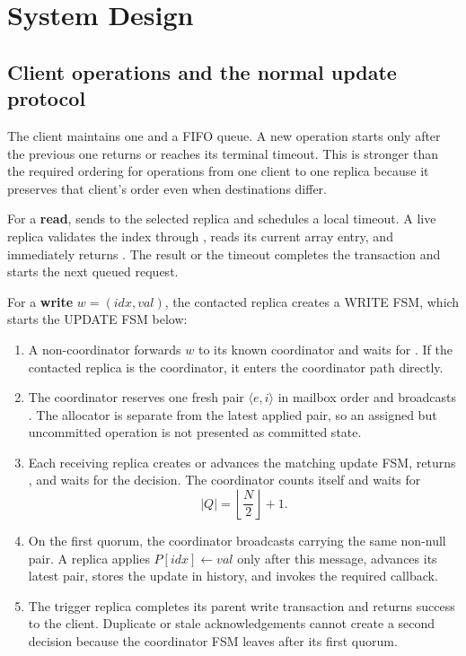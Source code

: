 \clearpage
\section{System Design}

\subsection{Client operations and the normal update protocol}

The client maintains one  and a FIFO queue. A new operation starts only after the previous one returns or reaches its terminal timeout. This is stronger than the required ordering for operations from one client to one replica because it preserves that client's order even when destinations differ.

For a \textbf{read},  sends  to the selected replica and schedules a local timeout. A live replica validates the index through , reads its current array entry, and immediately returns . The result or the timeout completes the transaction and starts the next queued request.

For a \textbf{write} $w=(idx,val)$, the contacted replica creates a WRITE FSM, which starts the UPDATE FSM below:

\begin{enumerate}[leftmargin=7mm,itemsep=1mm,topsep=1mm]
    \item A non-coordinator forwards $w$ to its known coordinator and waits for . If the contacted replica is the coordinator, it enters the coordinator path directly.
    \item The coordinator reserves one fresh pair $\langle e,i\rangle$ in mailbox order and broadcasts . The allocator is separate from the latest applied pair, so an assigned but uncommitted operation is not presented as committed state.
    \item Each receiving replica creates or advances the matching update FSM, returns , and waits for the decision. The coordinator counts itself and waits for
    \[
        |Q|=\left\lfloor\frac{N}{2}\right\rfloor+1.
    \]
    \item On the first quorum, the coordinator broadcasts  carrying the same non-null pair. A replica applies $P[idx]\leftarrow val$ only after this message, advances its latest pair, stores the update in history, and invokes the required callback.
    \item The trigger replica completes its parent write transaction and returns success to the client. Duplicate or stale acknowledgements cannot create a second decision because the coordinator FSM leaves  after its first quorum.
\end{enumerate}

